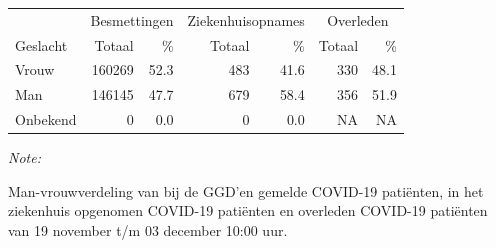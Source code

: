 \documentclass[
  english,
  man,floatsintext]{apa6}
\begin{document}
\newpage

\begin{table}
\centering\begingroup\fontsize{11}{13}\selectfont

\begin{threeparttable}
\begin{tabular}{lrrrrrr}
\toprule
\multicolumn{1}{c}{ } & \multicolumn{2}{c}{Besmettingen} & \multicolumn{2}{c}{Ziekenhuisopnames} & \multicolumn{2}{c}{Overleden} \\
\cmidrule(l{3pt}r{3pt}){2-3} \cmidrule(l{3pt}r{3pt}){4-5} \cmidrule(l{3pt}r{3pt}){6-7}
Geslacht & Totaal & \% & Totaal & \% & Totaal & \%\\
\midrule
Vrouw & 160269 & 52.3 & 483 & 41.6 & 330 & 48.1\\
Man & 146145 & 47.7 & 679 & 58.4 & 356 & 51.9\\
Onbekend & 0 & 0.0 & 0 & 0.0 & NA & NA\\
\bottomrule
\end{tabular}
\begin{tablenotes}
\item \textit{Note: } 
\item Man-vrouwverdeling van bij de GGD’en gemelde COVID-19 patiënten, in het ziekenhuis opgenomen COVID-19 patiënten en overleden COVID-19 patiënten van 19 november t/m 03 december 10:00 uur.
\end{tablenotes}
\end{threeparttable}
\endgroup{}
\end{table}
\newpage
\end{document}
